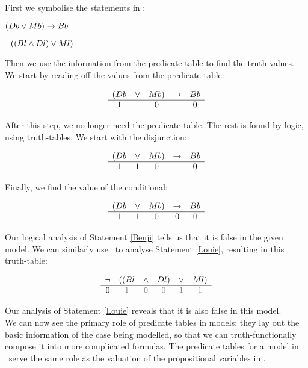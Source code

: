 \documentclass[PHIL101-Textbook.tex]{subfiles}
\begin{document}
\noindent First we symbolise the statements in \pl:

\begin{earg}
\item[\ex{Benjipl}] $(\mathord{D}{b} \vee \mathord{M}{b}) \rightarrow \mathord{B}{b}$
\item[\ex{Louiepl}] $\neg((\mathord{B}{l} \land \mathord{D}{l}) \vee \mathord{M}{l})$
\end{earg}

\noindent Then we use the information from the predicate table to find the truth-values. We start by reading off the values from the predicate table: 

\[\begin{array}{ccccc}
	(\mathord{D}{b}&\vee&\mathord{M}{b})&\rightarrow& \mathord{B}{b}\\\hline
	1& & 0&& 0
\end{array}\]

\noindent After this step, we no longer need the predicate table. The rest is found by logic, using truth-tables. We start with the disjunction: 

\[\begin{array}{ccccc}
	(\atom D b&\eor&\atom Mb)&\eif& \atom Bb\\\hline
	\gT & \vT & \gF&& \vF
\end{array}\]

\noindent Finally, we find the value of the conditional:

\[\begin{array}{ccccc}
	(\atom D b&\eor&\atom Mb)&\eif& \atom Bb\\\hline
	\gT & \gT & \gF&\vF& \gF
\end{array}\]

\noindent Our logical analysis of Statement \ref{Benji} tells us that it is false in the given model. We can similarly use \pl\ to analyse Statement \ref{Louie}, resulting in this truth-table:

\[\begin{array}{cccccc}
	\enot &((\atom B l&\eand&\atom D l)&\eor& \atom M l)\\\hline
	\vF & \gT & \gF & \gF & \gT& \gT
\end{array}\]

\noindent Our analysis of Statement \ref{Louie} reveals that it is also false in this model.\\

We can now see the primary role of predicate tables in models: they lay out the basic information of the case being modelled, so that we can truth-functionally compose it into more complicated formulas. The predicate tables for a model in \pl\ serve the same role as the valuation of the propositional variables in \tfl.
\end{document}
